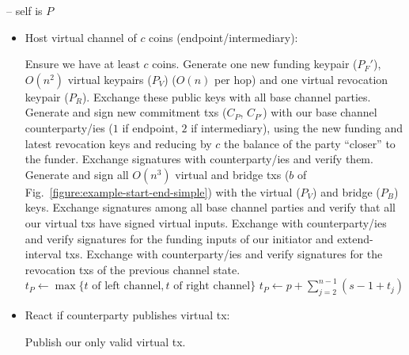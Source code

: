 \begin{center}
\begin{processbox}{\pchan -- self is $P$}
\begin{itemize}
      \item Host virtual channel of $c$ coins (endpoint/intermediary):
      \begin{algorithmic}[0]
        \State Ensure we have at least $c$ coins.
        \State Generate one new funding keypair ($P_F'$), $O(n^2)$ virtual
        keypairs ($P_V$)
        ($O(n)$ per hop) and one virtual revocation keypair ($P_R$).
        \State {}
        \State Exchange these public keys with all base channel parties.
        \State Generate and sign new commitment txs ($C_P$, $C_{P'}$) with our
        base channel counterparty/ies
        ($1$ if endpoint, $2$ if intermediary), using the new funding and latest
        revocation keys and reducing by $c$ the balance of the party ``closer''
        to the funder.
        \State Exchange signatures with counterparty/ies and verify them.
        \State Generate and sign all $O(n^3)$ virtual and bridge txs ($b$ of
        Fig.~\ref{figure:example-start-end-simple}) with the virtual ($P_V$) and
        bridge ($P_B$) keys.
        \State Exchange signatures among all base channel parties and verify
        that all our virtual txs have signed virtual inputs.
        \State Exchange with counterparty/ies and verify signatures for the
        funding inputs of our initiator and extend-interval txs.
        \State Exchange with counterparty/ies and verify signatures for the
        revocation txs of the previous channel state.
          \State $t_P \gets \max\{t \text{ of left channel}, t \text{ of right
          channel}\}$
        \Else \: 
          \State $t_P \gets p + \sum_{j = 2}^{n-1}(s - 1 + t_j)$
        \EndIf
      \end{algorithmic}

      \item React if counterparty publishes virtual tx:
      \begin{algorithmic}[0]
        \State Publish our only valid virtual tx. 
      \end{algorithmic}


\end{itemize}
\end{processbox}
\end{center}
